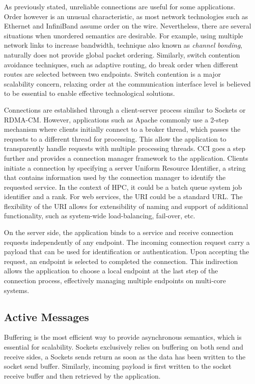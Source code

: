 As previously stated, unreliable connections are useful for some applications. 
Order however is an unusual characteristic, as most network technologies such 
as Ethernet and InfiniBand assume order on the wire. 
Nevertheless, there are several situations when unordered semantics are 
desirable. For example, using multiple network links to increase bandwidth, 
technique also known as \emph{channel bonding}, naturally does not provide 
global packet ordering. Similarly, switch contention avoidance techniques, 
such as adaptive routing, do break order when different routes are selected 
between two endpoints. Switch contention is a major scalability concern, 
relaxing order at the communication interface level is believed to be 
essential to enable effective technological solutions.

Connections are established through a client-server process similar to 
Sockets or RDMA-CM. However, applications such as 
Apache commonly use a 2-step mechanism where clients 
initially connect to a broker thread, which passes the requests to a 
different thread for processing. This allow the application to 
transparently handle requests with multiple processing threads.
CCI goes a step further and provides a connection manager framework to 
the application. Clients initiate a connection by specifying a server 
Uniform Resource Identifier, a string that contains information used 
by the connection manager to identify the requested service. In the context of 
HPC, it could be a batch queue system job identifier and a rank. For web 
services, the URI could be a standard URL. The flexibility of the URI allows 
for extensibility of naming and support of additional functionality, such as 
system-wide load-balancing, fail-over, etc.

On the server side, the application binds to a service and receive 
connection requests independently of any endpoint. The incoming connection 
request carry a payload that can be used for identification or authentication. 
Upon accepting the request, an endpoint is selected to completed the 
connection. This indirection allows the application to choose a local endpoint 
at the last step of the connection process, effectively managing multiple 
endpoints on multi-core systems.

\subsection{Active Messages}
Buffering is the most efficient way to provide asynchronous semantics, which 
is essential for scalability. Sockets exclusively relies on buffering on both 
send and receive sides, a Sockets sends return as soon as the data has been 
written to the socket send buffer. Similarly, incoming payload is first 
written to the socket receive buffer and then retrieved by the application.

